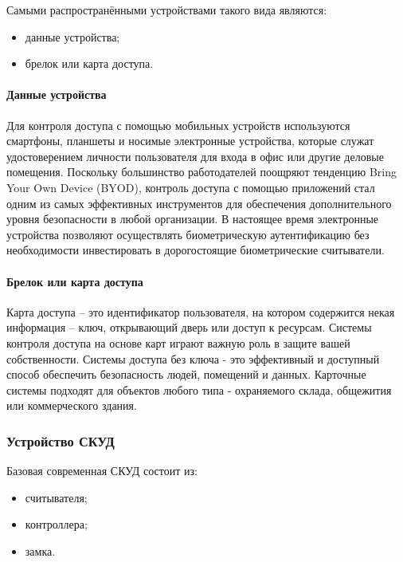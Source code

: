 Самыми распространёнными устройствами такого вида являются:

\begin{itemize}
	\item данные устройства;
	\item брелок или карта доступа.
\end{itemize}

\paragraph{Данные устройства}

Для контроля доступа с помощью мобильных устройств используются смартфоны, планшеты и носимые электронные устройства, которые служат удостоверением личности пользователя для входа в офис или другие деловые помещения. Поскольку большинство работодателей поощряют тенденцию Bring Your Own Device (BYOD), контроль доступа с помощью приложений стал одним из самых эффективных инструментов для обеспечения дополнительного уровня безопасности в любой организации. В настоящее время электронные устройства позволяют осуществлять биометрическую аутентификацию без необходимости инвестировать в дорогостоящие биометрические считыватели.

\paragraph{Брелок или карта доступа}

Карта доступа – это идентификатор пользователя, на котором содержится некая информация – ключ, открывающий дверь или доступ к ресурсам. 
Системы контроля доступа на основе карт играют важную роль в защите вашей собственности. Системы доступа без ключа - это эффективный и доступный способ обеспечить безопасность людей, помещений и данных. Карточные системы подходят для объектов любого типа - охраняемого склада, общежития или коммерческого здания.

\subsubsection{Устройство СКУД}

Базовая современная СКУД состоит из:

\begin{itemize}
	\item считывателя;
	\item контроллера;
	\item замка.
\end{itemize}

